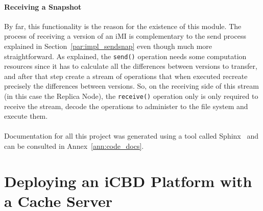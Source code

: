 \paragraph{Receiving a Snapshot}
\label{par:impl_receive_snap}
By far, this functionality is the reason for the existence of this module. The process of receiving a version of an iMI is complementary to the send process explained in Section~\ref{par:impl_sendsnap} even though much more straightforward. 
As explained, the \texttt{send()} operation needs some computation resources since it has to calculate all the differences between versions to transfer, and after that step create a stream of operations that when executed recreate precisely the differences between versions. 
So, on the receiving side of this stream (in this case the Replica Node), the \texttt{receive()} operation only is only required to receive the stream, decode the operations to administer to the file system and execute them.

\paragraph{}
Documentation for all this project was generated using a tool called Sphinx~\cite{py_sphinx} and can be consulted in Annex~\ref{ann:code_docs}.





\section{Deploying an iCBD Platform with a Cache Server}
\label{sec:impl_cache_server}


